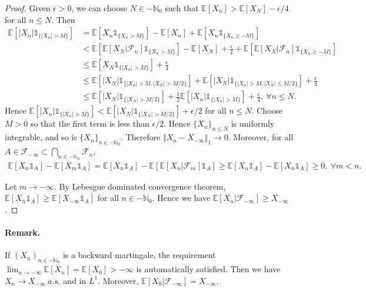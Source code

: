 \documentclass{article}
\numberwithin{equation}{section}
\newcommand{\E}{\mathbb{E}}
\theoremstyle{plain}
\theoremstyle{definition}
\begin{document}
\begin{proof}
Given $\epsilon>0$, we can choose $N\in-\mathbb{N}_0$ such that $\E[X_n]>\E[X_N]-\epsilon/4$ for all $n\leq N$. Then 
\begin{align*}
\E\left[\vert X_n\vert\mathds{1}_{\{\vert X_n\vert> M\}}\right] &= \E\left[X_n\mathds{1}_{\{X_n>M\}}\right] - \E[X_n] + \E\left[X_n\mathds{1}_{\{X_n\geq -M\}}\right]\\
&< \E\left[\E[X_N|\mathscr{F}_n]\mathds{1}_{\{X_n>M\}}\right] - \E[X_N] + \frac{\epsilon}{4} + \E\left[\E[X_N|\mathscr{F}_n]\mathds{1}_{\{X_n\geq -M\}}\right]\\
&\leq \E\left[X_N\mathds{1}_{\{\vert X_n\vert>M\}}\right] + \frac{\epsilon}{4}\\
&\leq\E\left[\vert X_N\vert\mathds{1}_{\{\vert X_n\vert >M,\vert X_N\vert>M/2\}}\right] + \E\left[\vert X_N\vert\mathds{1}_{\{\vert X_n\vert >M,\vert X_N\vert\leq M/2\}}\right] + \frac{\epsilon}{4}\\
&\leq \E\left[\vert X_N\vert\mathds{1}_{\{\vert X_N\vert>M/2\}}\right] + \frac{1}{2}\E\left[\vert X_n\vert\mathds{1}_{\{\vert X_n\vert >M\}}\right] + \frac{\epsilon}{4},\ \forall n\leq N.
\end{align*}
Hence $\E\left[\vert X_n\vert\mathds{1}_{\{\vert X_n\vert> M\}}\right]<\E\left[\vert X_N\vert\mathds{1}_{\{\vert X_N\vert>M/2\}}\right]+\epsilon/2$ for all $n\leq N$. Choose $M>0$ so that the first term is less than $\epsilon/2$. Hence $\{X_n\}_{n\leq N}$ is uniformly integrable, and so is $\{X_n\}_{n\in -\mathbb{N}_0}$. Therefore $\Vert X_n- X_{-\infty}\Vert_1\to 0$. Moreover, for all $A\in\mathscr{F}_{-\infty}\subset\bigcap_{n\in-\mathbb{N}_0}\mathscr{F}_n$,
\begin{align*}
	\E[X_n\mathds{1}_A]-\E[X_m\mathds{1}_A] = \E[X_n\mathds{1}_A] - \E[\E[X_n|\mathscr{F}_m]\mathds{1}_A] \geq \E[X_n\mathds{1}_A]-\E[X_n\mathds{1}_A]\geq 0,\ \forall m<n.
\end{align*}

Let $m\to-\infty$. By Lebesgue dominated convergence theorem, $\E[X_n\mathds{1}_A]\geq\E[X_{-\infty}\mathds{1}_A]$ for all $n\in-\mathbb{N}_0$. Hence we have $\E[X_n|\mathscr{F}_{-\infty}]\geq X_{-\infty}$. 
\end{proof}

\paragraph{Remark.} If $(X_n)_{n\in-\mathbb{N}_0}$ is a backward martingale, the requirement $\lim_{n\to-\infty}\E[X_n]=\E[X_0]>-\infty$ is automatically satisfied. Then we have $X_n\to X_{-\infty}\ a.s.$ and in $L^1$. Moreover, $\E[X_0|\mathscr{F}_{-\infty}]=X_{-\infty}$.
\end{document}
